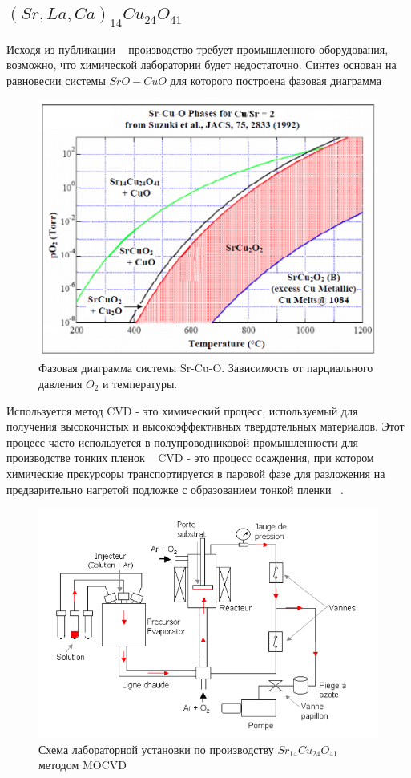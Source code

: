 \documentclass[11pt]{article}
\begin{document}
\subsection{$(Sr,La,Ca)_{14}Cu_{24}O_{41}$}
Исходя из публикации ~\cite{khan_afzal_2011_dA_finitif} производство требует промышленного оборудования, возможно, что химической лаборатории будет недостаточно. Синтез основан на равновесии системы $SrO-CuO$ для которого построена фазовая диаграмма

\begin{figure}[htp]
\centering
\includegraphics[scale=0.9]{Sr_14_Cu_24_O_41_ph}
\caption{Фазовая диаграмма системы Sr-Cu-O. Зависимость от парциального давления $O_2$ и температуры.~\cite{hiroi1996}}
\label{}
\end{figure}

Используется метод CVD - это химический процесс, используемый для получения высокочистых и высокоэффективных твердотельных материалов. Этот процесс часто используется в полупроводниковой промышленности для производстве тонких пленок ~\cite{cvd}
CVD - это процесс осаждения, при котором химические прекурсоры транспортируется в паровой фазе для разложения на предварительно нагретой подложке с образованием тонкой пленки ~\cite{cvd_1}.

\begin{figure}[htp]
\centering
\includegraphics[scale=0.6]{mocvd}
\caption{Схема лабораторной установки по производству  $Sr_{14}Cu_{24}O_{41}$ методом MOCVD ~\cite{khan_afzal_2011_dA_finitif}}
\label{}
\end{figure}
\end{document}
